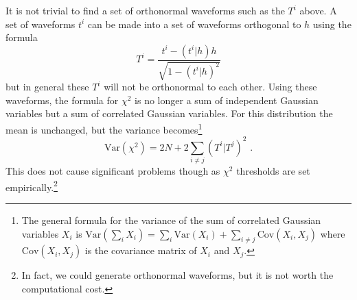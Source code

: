 \documentclass[11pt]{cuthesis}
\newcommand{\fs}{\text{ .}}
\begin{document}
It is not trivial to find a set of orthonormal waveforms such as the $T^i$ above. A set of waveforms $t^i$ can be made into a set of waveforms orthogonal to $h$ using the formula
\begin{equation}
T^i = \frac{t^i - (t^i|h)h}{\sqrt{1-(t^i|h)^2}}
\end{equation}
but in general these $T^i$ will not be orthonormal to each other. Using these waveforms, the formula for $\chi^2$ is no longer a sum of independent Gaussian variables but a sum of correlated Gaussian variables. For this distribution the mean is unchanged, but the variance becomes\footnote{The general formula for the variance of the sum of correlated Gaussian variables $X_i$ is $\text{Var}(\sum_i X_i) = \sum_i \text{Var}(X_i) + \sum_{i \neq j} \text{Cov}(X_i,X_j) $ where $\text{Cov}(X_i,X_j)$ is the covariance matrix of $X_i$ and $X_j$.}
\begin{equation} \label{single det chisq var}
\text{Var}(\chi^2) = 2N + 2\sum_{i \neq j} (T^i|T^j)^2 \fs
\end{equation}
This does not cause significant problems though as $\chi^2$ thresholds are set empirically.\footnote{In fact, we could generate orthonormal waveforms, but it is not worth the computational cost.} 
\end{document}
